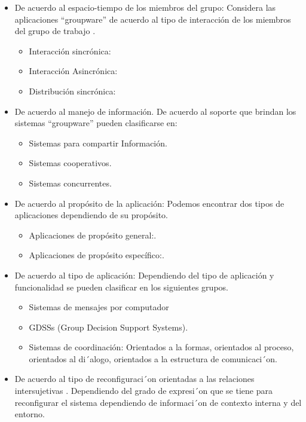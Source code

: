 \begin{itemize}

\item De acuerdo al espacio-tiempo de los miembros del grupo: Considera las
aplicaciones “groupware” de acuerdo al tipo de interacción de los miembros del
grupo de trabajo \cite{cap1.4.groupware}.

\begin{itemize}
 \item Interacción sincrónica:
 \item Interacción Asincrónica:
 \item Distribución sincrónica:
\end{itemize}



\item De acuerdo al manejo de información. De acuerdo al soporte que brindan
\cite{cap1.5.groupware} los sistemas “groupware” pueden clasificarse en:
\begin{itemize}
 \item Sistemas para compartir Información.
 \item Sistemas cooperativos.
 \item Sistemas concurrentes.
\end{itemize}


\item De acuerdo al propósito de la aplicación: Podemos encontrar dos tipos de
aplicaciones dependiendo de su propósito.
\begin{itemize}
 \item Aplicaciones de propósito general:.
 \item Aplicaciones de propósito específico:.
\end{itemize}


\item De acuerdo al tipo de aplicación: Dependiendo del tipo de aplicación
y funcionalidad se pueden clasificar en los siguientes grupos.

\begin{itemize}
 \item Sistemas de mensajes por computador
 \item GDSSs (Group Decision Support Systems).
 \item Sistemas de coordinación: Orientados a la formas, orientados al proceso,
orientados al di´alogo, orientados a la estructura de comunicaci´on.	
\end{itemize}


\item De acuerdo al tipo de reconfiguraci´on orientadas a las relaciones
intersujetivas \cite{libro.unr}. Dependiendo del grado de expresi´on que se
tiene para reconfigurar el sistema dependiendo de informaci´on de contexto
interna y del entorno.


\end{itemize}
